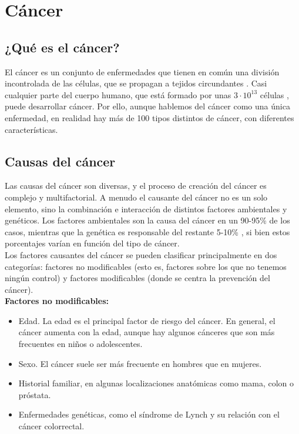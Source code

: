 \chapter{Cáncer}

\section{¿Qué es el cáncer?}

El cáncer es un conjunto de enfermedades que tienen en común una división incontrolada de las células, que se propagan a tejidos circundantes \cite{NationalCancerInstitute2015}. Casi cualquier parte del cuerpo humano, que está formado por unas $3\cdot10^ {13}$ células \cite{Sender2016}, puede desarrollar cáncer. Por ello, aunque hablemos del cáncer como una única enfermedad, en realidad hay más de 100 tipos distintos de cáncer, con diferentes características.

\section{Causas del cáncer}

Las causas del cáncer son diversas, y el proceso de creación del cáncer es complejo y multifactorial. A menudo el causante del cáncer no es un solo elemento, sino la combinación e interacción de distintos factores ambientales y genéticos. Los factores ambientales son la causa del cáncer en un 90-95\% de los casos, mientras que la genética es responsable del restante 5-10\% \cite{SanchezPerez2016}, si bien estos porcentajes varían en función del tipo de cáncer.\\

Los factores causantes del cáncer se pueden clasificar principalmente en dos categorías: factores no modificables (esto es, factores sobre los que no tenemos ningún control) y factores modificables (donde se centra la prevención del cáncer).\\

\textbf{Factores no modificables:}
\begin{itemize}
	\item Edad. La edad es el principal factor de riesgo del cáncer. En general, el cáncer aumenta con la edad, aunque hay algunos cánceres que son más frecuentes en niños o adolescentes.
	\item Sexo. El cáncer suele ser más frecuente en hombres que en mujeres.
	\item Historial familiar, en algunas localizaciones anatómicas como mama, colon o próstata.
	\item Enfermedades genéticas, como el síndrome de Lynch y su relación con el cáncer colorrectal.
\end{itemize}

